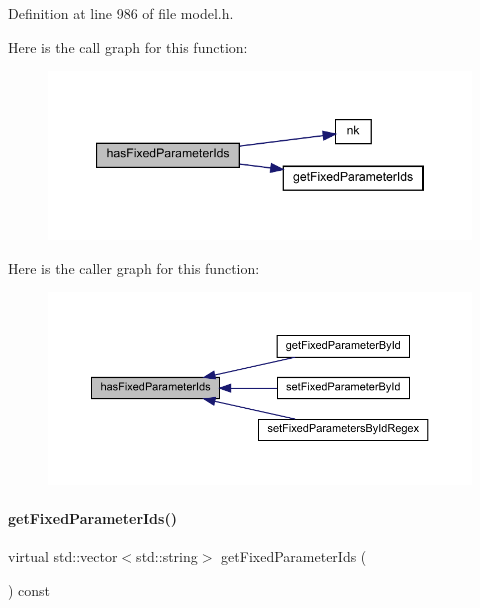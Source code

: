 Definition at line 986 of file model.\+h.

Here is the call graph for this function\+:
\nopagebreak
\begin{figure}[H]
\begin{center}
\leavevmode
\includegraphics[width=347pt]{classamici_1_1_model_af6cb68d368b1288fa0d7515242bf7a5b_cgraph}
\end{center}
\end{figure}
Here is the caller graph for this function\+:
\nopagebreak
\begin{figure}[H]
\begin{center}
\leavevmode
\includegraphics[width=350pt]{classamici_1_1_model_af6cb68d368b1288fa0d7515242bf7a5b_icgraph}
\end{center}
\end{figure}
\mbox{\label{classamici_1_1_model_a802aef820cb7ddabfb6330abba320bcf}} 
\paragraph{\texorpdfstring{get\+Fixed\+Parameter\+Ids()}{getFixedParameterIds()}}
{\footnotesize\ttfamily virtual std\+::vector$<$std\+::string$>$ get\+Fixed\+Parameter\+Ids (\begin{DoxyParamCaption}{ }\end{DoxyParamCaption}) const\hspace{0.3cm}{\ttfamily [virtual]}}

